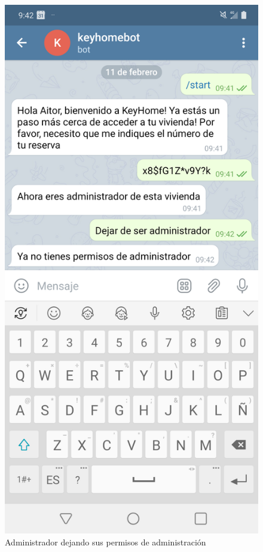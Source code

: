 \begin{figure}[tbp]
\centering
\includegraphics[scale=0.15]{fig/Dejar-de-ser-administrador.png}
\caption{Administrador dejando sus permisos de administración}
\label{fig:administrador-dejando-sus-permisos-de-administracion}
\end{figure}

